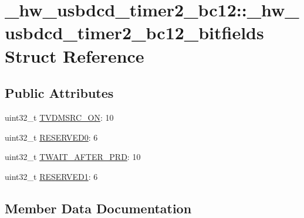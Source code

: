 \hypertarget{struct__hw__usbdcd__timer2__bc12_1_1__hw__usbdcd__timer2__bc12__bitfields}{}\section{\+\_\+hw\+\_\+usbdcd\+\_\+timer2\+\_\+bc12\+:\+:\+\_\+hw\+\_\+usbdcd\+\_\+timer2\+\_\+bc12\+\_\+bitfields Struct Reference}
\label{struct__hw__usbdcd__timer2__bc12_1_1__hw__usbdcd__timer2__bc12__bitfields}
\subsection*{Public Attributes}
\begin{DoxyCompactItemize}
\item 
uint32\+\_\+t \hyperlink{struct__hw__usbdcd__timer2__bc12_1_1__hw__usbdcd__timer2__bc12__bitfields_a304c7958819f7c41d2016842c07c1d3f}{T\+V\+D\+M\+S\+R\+C\+\_\+\+ON}\+: 10
\item 
uint32\+\_\+t \hyperlink{struct__hw__usbdcd__timer2__bc12_1_1__hw__usbdcd__timer2__bc12__bitfields_a0a1cb16b60fb78302bfbc90eb36be5d0}{R\+E\+S\+E\+R\+V\+E\+D0}\+: 6
\item 
uint32\+\_\+t \hyperlink{struct__hw__usbdcd__timer2__bc12_1_1__hw__usbdcd__timer2__bc12__bitfields_a555a32fe5b6a285d29970cd9532a3ee9}{T\+W\+A\+I\+T\+\_\+\+A\+F\+T\+E\+R\+\_\+\+P\+RD}\+: 10
\item 
uint32\+\_\+t \hyperlink{struct__hw__usbdcd__timer2__bc12_1_1__hw__usbdcd__timer2__bc12__bitfields_ae6e19dc3e46483b40a2c2a694a472067}{R\+E\+S\+E\+R\+V\+E\+D1}\+: 6
\end{DoxyCompactItemize}


\subsection{Member Data Documentation}
